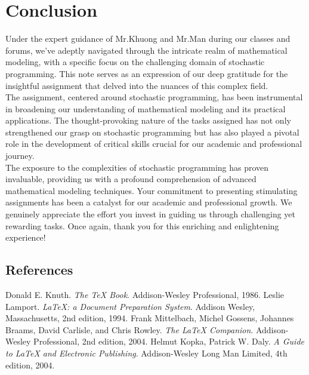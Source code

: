 \documentclass[a4paper]{article}
\begin{document}
		\section{Conclusion}
		\hspace{1.5em}Under the expert guidance of Mr.Khuong and Mr.Man during our classes and forums, we've adeptly navigated through the intricate realm of mathematical modeling, with a specific focus on the challenging domain of stochastic programming. This note serves as an expression of our deep gratitude for the insightful assignment that delved into the nuances of this complex field.\\
		
		The assignment, centered around stochastic programming, has been instrumental in broadening our understanding of mathematical modeling and its practical applications. The thought-provoking nature of the tasks assigned has not only strengthened our grasp on stochastic programming but has also played a pivotal role in the development of critical skills crucial for our academic and professional journey.\\
		
		The exposure to the complexities of stochastic programming has proven invaluable, providing us with a profound comprehension of advanced mathematical modeling techniques. Your commitment to presenting stimulating assignments has been a catalyst for our academic and professional growth. We genuinely appreciate the effort you invest in guiding us through challenging yet rewarding tasks. Once again, thank you for this enriching and enlightening experience!
		\newpage
		\subsection{References}
		
		\begin{thebibliography}{99}
			\bibitem[1][ School of Modern Post, Beijing University of Posts and Telecommunications, China, \textit{Computers \& Industrial Engineering}, chapter: A two-stage stochastic programming framework for evacuation planning in disaster responses, 2020.
			\bibitem[2]{knuth86} Donald E. Knuth. \textit{The \TeX{} Book}. Addison-Wesley Professional, 1986.
			 Leslie Lamport. \textit{\LaTeX{}: a Document Preparation System}. Addison Wesley, Massachusetts, 2nd edition, 1994.
			 Frank Mittelbach, Michel Gossens, Johannes Braams, David Carlisle, and Chris Rowley. \textit{The \LaTeX{} Companion}. Addison-Wesley Professional, 2nd edition, 2004.
			 Helmut Kopka, Patrick W. Daly. \textit{A Guide to \LaTeX{} and Electronic Publishing}. Addison-Wesley Long Man Limited, 4th edition, 2004.
		\end{thebibliography}
		
		
	
\end{document}
